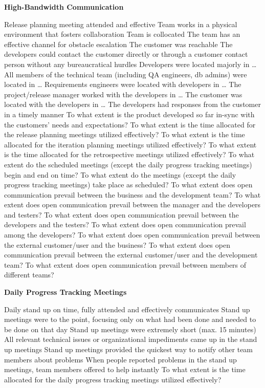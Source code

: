 \textbf{High-Bandwidth Communication}
\begin{itemize}
	\taa Release planning meeting attended and effective
	\taa Team works in a physical environment that fosters collaboration
	\taa Team is collocated%
	\taa The team has an effective channel for obstacle escalation%
	\pam The customer was reachable%
	\pam The developers could contact the customer directly or through a customer contact person without any bureaucratical hurdles%
	\pam Developers were located majorly in \ldots%
	\pam All members of the technical team (including QA engineers, db admins) were located in \ldots%
	\pam Requirements engineers were located with developers in \ldots%
	\pam The project/release manager worked with the developers in \ldots%
	\pam The customer was located with the developers in \ldots%
	\pam The developers had responses from the customer in a timely manner%
	\ops To what extent is the product developed so far in-sync with the customers' needs and expectations?
	\ops To what extent is the time allocated for the release planning meetings utilized effectively?
	\ops To what extent is the time allocated for the iteration planning meetings utilized effectively?
	\ops To what extent is the time allocated for the retrospective meetings utilized effectively?
	\ops To what extent do the scheduled meetings (except the daily progress tracking meetings) begin and end on time?
	\ops To what extent do the meetings (except the daily progress tracking meetings) take place as scheduled? 
	\ops To what extent does open communication prevail between the business and the development team? 
	\ops To what extent does open communication prevail between the manager and the developers and testers? 
	\ops To what extent does open communication prevail between the developers and the testers? 
	\ops To what extent does open communication prevail among the developers? 
	\ops To what extent does open communication prevail between the external customer/user and the business? 
	\ops To what extent does open communication prevail between the external customer/user and the development team?
	\ops To what extent does open communication prevail between members of different teams? 
\end{itemize}

\textbf{Daily Progress Tracking Meetings}
\begin{itemize}
	\taa Daily stand up on time, fully attended and effectively communicates%
	\pam Stand up meetings were to the point, focusing only on what had been done and needed to be done on that day%
	\pam Stand up meetings were extremely short (max. 15 minutes)%
	\pam All relevant technical issues or organizational impediments came up in the stand up meetings%
	\pam Stand up meetings provided the quickest way to notify other team members about problems%
	\pam When people reported problems in the stand up meetings, team members offered to help instantly%
	\ops To what extent is the time allocated for the daily progress tracking meetings utilized effectively?
\end{itemize}

